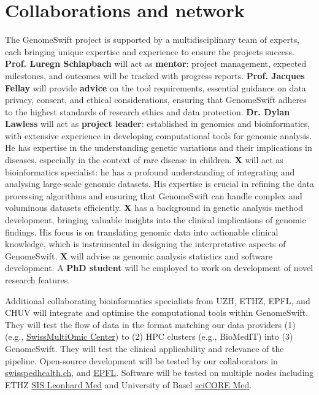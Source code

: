 
\section{Collaborations and network}\label{involved-persons}

The GenomeSwift project is supported by a multidisciplinary team of
experts, each bringing unique expertise and experience to ensure the
project\textquotesingle s success. \textbf{Prof. Luregn Schlapbach} will
act as \textbf{mentor}: project management, expected milestones, and
outcomes will be tracked with progress reports. \textbf{Prof. Jacques
Fellay} will provide \textbf{advice} on the tool requirements, essential
guidance on data privacy, consent, and ethical considerations, ensuring
that GenomeSwift adheres to the highest standards of research ethics and
data protection. \textbf{Dr. Dylan Lawless} will act as \textbf{project
leader}: established in genomics and bioinformatics, with extensive
experience in developing computational tools for genomic analysis. He
has expertise in the understanding genetic variations and their
implications in diseases, especially in the context of rare disease in
children. \textbf{X} will act as bioinformatics specialist: he has a
profound understanding of integrating and analysing large-scale genomic
datasets. His expertise is crucial in refining the data processing
algorithms and ensuring that GenomeSwift can handle complex and
voluminous datasets efficiently. \textbf{X} has a background in genetic
analysis method development, bringing valuable insights into the
clinical implications of genomic findings. His focus is on translating
genomic data into actionable clinical knowledge, which is instrumental
in designing the interpretative aspects of GenomeSwift. \textbf{X} will
advise as genomic analysis statistics and software development. A
\textbf{PhD student} will be employed to work on development of novel
research features.

Additional collaborating bioinformatics specialists from UZH, ETHZ,
EPFL, and CHUV will integrate and optimise the computational tools
within GenomeSwift. They will test the flow of data in the format
matching our data providers (1) (e.g.,
\href{http://smoc.ethz.ch/}{SwissMultiOmic Center}) to (2) HPC clusters
(e.g., BioMedIT) into (3) GenomeSwift. They will test the clinical
applicability and relevance of the pipeline. Open-source development
will be tested by our collaborators in
\href{https://www.swisspedhealth.ch/}{swisspedhealth.ch}, and
\href{https://www.epfl.ch/labs/fellay-lab/}{EPFL}. Software will be
tested on multiple nodes including ETHZ
\href{https://unlimited.ethz.ch/display/LeoMed2/Leonhard+Med+Intro+for+shareholders}{SIS
Leonhard Med} and University of Basel
\href{https://scicore.unibas.ch/}{sciCORE Med}.

